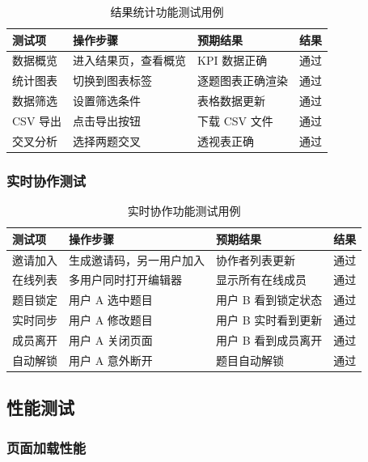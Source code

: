 \begin{table}[H]
\centering
\caption{结果统计功能测试用例}
\label{tab:results-test}
\begin{tabular}{p{3cm}p{4cm}p{3cm}p{2cm}}
\toprule
\textbf{测试项} & \textbf{操作步骤} & \textbf{预期结果} & \textbf{结果} \\
\midrule
数据概览 & 进入结果页，查看概览 & KPI 数据正确 & 通过 \\
统计图表 & 切换到图表标签 & 逐题图表正确渲染 & 通过 \\
数据筛选 & 设置筛选条件 & 表格数据更新 & 通过 \\
CSV 导出 & 点击导出按钮 & 下载 CSV 文件 & 通过 \\
交叉分析 & 选择两题交叉 & 透视表正确 & 通过 \\
\bottomrule
\end{tabular}
\end{table}

\subsubsection{实时协作测试}

\begin{table}[H]
\centering
\caption{实时协作功能测试用例}
\label{tab:collab-test}
\begin{tabular}{p{3cm}p{4cm}p{3cm}p{2cm}}
\toprule
\textbf{测试项} & \textbf{操作步骤} & \textbf{预期结果} & \textbf{结果} \\
\midrule
邀请加入 & 生成邀请码，另一用户加入 & 协作者列表更新 & 通过 \\
在线列表 & 多用户同时打开编辑器 & 显示所有在线成员 & 通过 \\
题目锁定 & 用户 A 选中题目 & 用户 B 看到锁定状态 & 通过 \\
实时同步 & 用户 A 修改题目 & 用户 B 实时看到更新 & 通过 \\
成员离开 & 用户 A 关闭页面 & 用户 B 看到成员离开 & 通过 \\
自动解锁 & 用户 A 意外断开 & 题目自动解锁 & 通过 \\
\bottomrule
\end{tabular}
\end{table}

\subsection{性能测试}

\subsubsection{页面加载性能}

